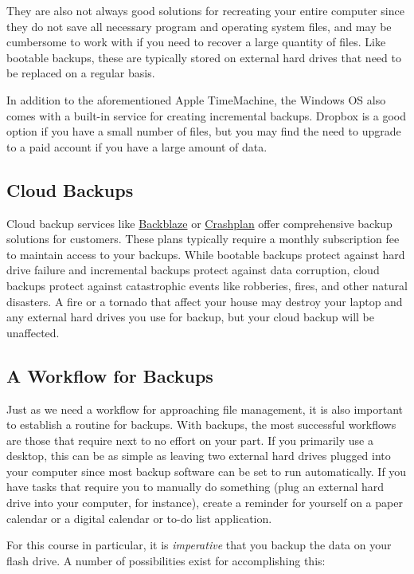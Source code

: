 \documentclass[]{book}
\theoremstyle{definition}
\theoremstyle{definition}
\theoremstyle{definition}
\theoremstyle{remark}
\begin{document}
They are also not always good solutions for recreating your entire
computer since they do not save all necessary program and operating
system files, and may be cumbersome to work with if you need to recover
a large quantity of files. Like bootable backups, these are typically
stored on external hard drives that need to be replaced on a regular
basis.

In addition to the aforementioned Apple TimeMachine, the Windows OS also
comes with a built-in service for creating incremental backups. Dropbox
is a good option if you have a small number of files, but you may find
the need to upgrade to a paid account if you have a large amount of
data.

\subsection{Cloud Backups}\label{cloud-backups}

Cloud backup services like \href{https://www.backblaze.com}{Backblaze}
or \href{https://www.code42.com/crashplan/}{Crashplan} offer
comprehensive backup solutions for customers. These plans typically
require a monthly subscription fee to maintain access to your backups.
While bootable backups protect against hard drive failure and
incremental backups protect against data corruption, cloud backups
protect against catastrophic events like robberies, fires, and other
natural disasters. A fire or a tornado that affect your house may
destroy your laptop and any external hard drives you use for backup, but
your cloud backup will be unaffected.

\subsection{A Workflow for Backups}\label{a-workflow-for-backups}

Just as we need a workflow for approaching file management, it is also
important to establish a routine for backups. With backups, the most
successful workflows are those that require next to no effort on your
part. If you primarily use a desktop, this can be as simple as leaving
two external hard drives plugged into your computer since most backup
software can be set to run automatically. If you have tasks that require
you to manually do something (plug an external hard drive into your
computer, for instance), create a reminder for yourself on a paper
calendar or a digital calendar or to-do list application.

For this course in particular, it is \emph{imperative} that you backup
the data on your flash drive. A number of possibilities exist for
accomplishing this:
\end{document}
